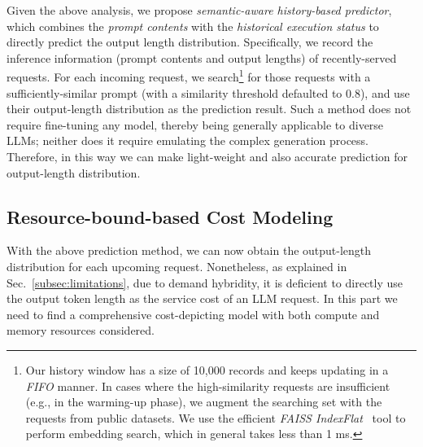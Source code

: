 Given the above analysis, we propose \emph{semantic-aware history-based predictor}, which combines the \emph{prompt contents} with the \emph{historical execution status} to directly predict the output length distribution. 
Specifically, we record the inference information (prompt contents and output lengths) of recently-served requests.
For each incoming request, we search\footnote{Our history window has a size of 10,000 records and keeps updating in a \emph{FIFO} manner. 
    In cases where the high-similarity requests are insufficient (e.g., in the warming-up phase), we augment the searching set with the requests from public datasets.
    We use the efficient \emph{FAISS IndexFlat}~\cite{faiss_meta} {tool} to perform embedding search, which in general takes {less than 1 ms}.
}
for those requests with a sufficiently-similar prompt (with a similarity threshold defaulted to 0.8), and use their output-length distribution as the prediction result.
Such a method does not require fine-tuning any model, thereby being generally applicable to diverse LLMs; neither does it require emulating the complex generation process.
Therefore, in this way we can make light-weight and also accurate prediction for output-length distribution. %



\subsection{Resource-bound-based Cost Modeling}
\label{subsec:cost}

With the above prediction method, we can now obtain the output-length distribution for each upcoming request. 
Nonetheless, as explained in Sec.~\ref{subsec:limitations}, due to demand hybridity, it is deficient to directly use the output token length as the service cost of an LLM request.
In this part we need to find a comprehensive cost-depicting model with both compute and memory resources considered. 

